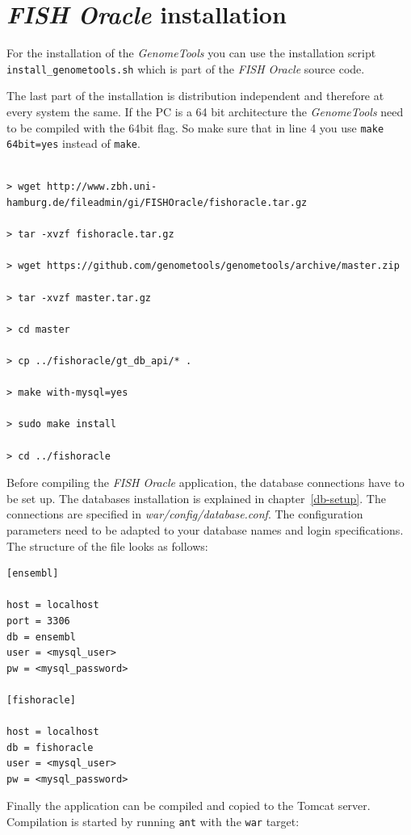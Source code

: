 \documentclass[11pt,final]{article}
\newcommand{\Gt}[0]{\emph{GenomeTools}\xspace}
\newcommand{\FO}[0]{\emph{FISH Oracle}\xspace}
\begin{document}
\section{\FO installation}
\label{fo-install}

For the installation of the \Gt you can use the installation script
\texttt{install\_genometools.sh} which is part of the \FO source code.

The last part of the installation is distribution independent
and therefore at every system the same. If the PC is a 64 bit
architecture the \Gt need to be compiled with the 64bit
flag. So make sure that in line 4 you use \texttt{make 64bit=yes}
instead of \texttt{make}.

\begin{lstlisting}

> wget http://www.zbh.uni-hamburg.de/fileadmin/gi/FISHOracle/fishoracle.tar.gz

> tar -xvzf fishoracle.tar.gz

> wget https://github.com/genometools/genometools/archive/master.zip

> tar -xvzf master.tar.gz

> cd master

> cp ../fishoracle/gt_db_api/* .

> make with-mysql=yes

> sudo make install

> cd ../fishoracle

\end{lstlisting}

Before compiling the \FO application, the database connections have
to be set up. The databases installation is explained in
chapter~\ref{db-setup}. The connections are specified in
\textit{war/config/database.conf}. The configuration parameters need to be
adapted to your database names and login specifications. The structure of the
file looks as follows:

\begin{verbatim}
[ensembl]

host = localhost
port = 3306
db = ensembl
user = <mysql_user>
pw = <mysql_password>

[fishoracle]

host = localhost
db = fishoracle
user = <mysql_user>
pw = <mysql_password>
\end{verbatim}

Finally the application can be compiled and copied to the Tomcat server.
Compilation is started by running \texttt{ant} with the \texttt{war} target:
\end{document}
